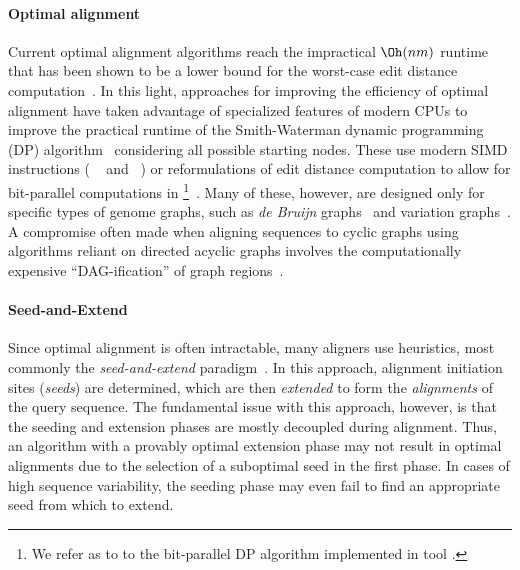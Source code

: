 \paragraph{Optimal alignment}
Current optimal alignment algorithms reach the impractical $\Oh(nm)$ runtime
that has been shown to be a lower bound for the worst-case edit distance
computation~\cite{backurs2015edit}. In this light, approaches for improving the
efficiency of optimal alignment have taken advantage of specialized features of
modern CPUs to improve the practical runtime of the Smith-Waterman dynamic
programming (DP) algorithm~\cite{smith_comparison_1981} considering all possible
starting nodes. These use modern SIMD instructions (\eg
\vg~\cite{garrison_variation_2018} and \pasgal~\cite{jain_accelerating_2019}) or
reformulations of edit distance computation to allow for bit-parallel
computations in \graphaligner \footnote{We refer as \bitparallel to to the
bit-parallel DP algorithm implemented in \graphaligner tool
\cite{rautiainen_bitparallel_2019}.}~\cite{rautiainen_bitparallel_2019}. Many of
these, however, are designed only for specific types of genome graphs, such as
{\itshape de Bruijn}
graphs~\cite{liu_debga_2016,limasset2019toward} and
variation graphs~\cite{garrison_variation_2018}. A compromise often made when
aligning sequences to cyclic graphs using algorithms reliant on directed acyclic
graphs involves the computationally expensive ``DAG-ification'' of graph
regions~\cite{kavya_sequence_2019,garrison_variation_2018}.

\paragraph{Seed-and-Extend}
Since optimal alignment is often intractable, many aligners use heuristics, most
commonly the \emph{seed-and-extend}
paradigm~\cite{altschul_basic_1990,langmead_fast_2012,li_fast_2009}. In this
approach, alignment initiation sites (\emph{seeds}) are determined, which are
then \emph{extended} to form the \emph{alignments} of the query sequence. The
fundamental issue with this approach, however, is that the seeding and extension
phases are mostly decoupled during alignment. Thus, an algorithm with a provably
optimal extension phase may not result in optimal alignments due to the
selection of a suboptimal seed in the first phase. In cases of high sequence
variability, the seeding phase may even fail to find an appropriate seed from
which to extend.